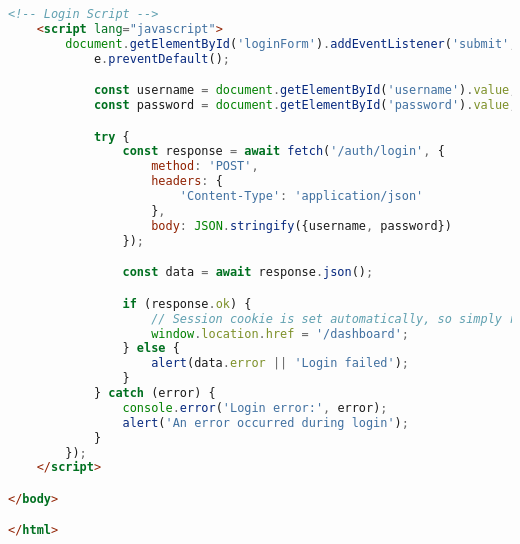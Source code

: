 \begin{lstlisting}[language=HTML]
    <!-- Login Script -->
    <script lang="javascript">
        document.getElementById('loginForm').addEventListener('submit', async function (e) {
            e.preventDefault();

            const username = document.getElementById('username').value;
            const password = document.getElementById('password').value;

            try {
                const response = await fetch('/auth/login', {
                    method: 'POST',
                    headers: {
                        'Content-Type': 'application/json'
                    },
                    body: JSON.stringify({username, password})
                });

                const data = await response.json();

                if (response.ok) {
                    // Session cookie is set automatically, so simply redirect to dashboard
                    window.location.href = '/dashboard';
                } else {
                    alert(data.error || 'Login failed');
                }
            } catch (error) {
                console.error('Login error:', error);
                alert('An error occurred during login');
            }
        });
    </script>

</body>

</html>

\end{lstlisting}

